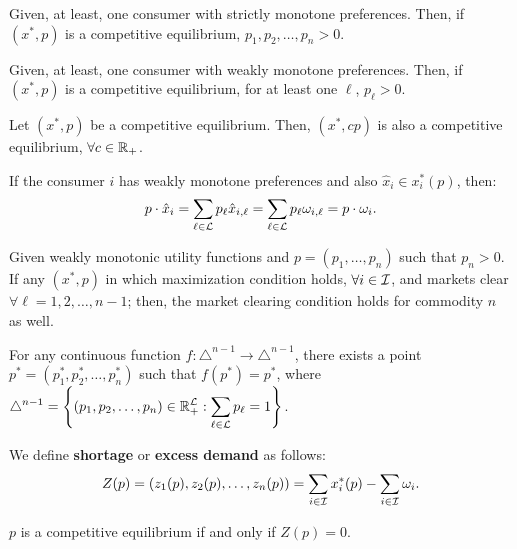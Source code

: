 \documentclass[8pt,a4paper]{extarticle}
\begin{document}
\begin{multicols}{3}
\begin{boxprop}
	Given, at least, one consumer with strictly monotone preferences. Then, if $(x^*, p)$ is a competitive equilibrium, $p_1, p_2, \ldots, p_n > 0$.
\end{boxprop}

\newpage

\begin{boxprop}
	Given, at least, one consumer with weakly monotone preferences. Then, if $(x^*, p)$ is a competitive equilibrium, for at least one $\ell$, $p_\ell > 0$.
\end{boxprop}

\begin{boxprop}
	Let $(x^*, p)$ be a competitive equilibrium. Then, $(x^*, cp)$ is also a competitive equilibrium, $\forall c \in \mathbb{R}_+$.
\end{boxprop}

\begin{boxtheo}
	If the consumer $i$ has weakly monotone preferences and also $\hat{x}_i \in x^*_i (p)$, then:
	\[
		p \cdot \hat{x}_i = \sum_{\ell \in \mathcal{L}} p_\ell \hat{x}_{i, \ell} = \sum_{\ell \in \mathcal{L}} p_\ell \omega_{i, \ell} = p \cdot \omega_i
	.\] 
\end{boxtheo}

\begin{boxcor}
	Given weakly monotonic utility functions and $p = (p_1, \ldots, p_n)$ such that $p_n > 0$. If any $(x^*, p)$ in which maximization condition holds, $\forall i \in \mathcal{I}$, and markets clear $\forall \ell = 1, 2, \ldots, n - 1$; then, the market clearing condition holds for commodity $n$ as well.
\end{boxcor}

\begin{boxtheo}
	For any continuous function $f : \triangle^{n - 1} \to \triangle^{n - 1}$, there exists a point $p^* = (p^*_1, p^*_2, \ldots, p^*_n)$ such that $f(p^*) = p^*$, where $\displaystyle \triangle^{n - 1} = \left\{(p_1, p_2, \ldots, p_n) \in \mathbb{R}_+^{\mathcal{L}} : \sum_{\ell \in \mathcal{L}} p_\ell = 1 \right\}$.
\end{boxtheo}

\begin{boxdef}[Shortage]
	We define \textbf{shortage} or \textbf{excess demand} as follows:
	\[
		Z(p) = (z_1(p), z_2(p), \ldots, z_n(p)) = \sum_{i \in \mathcal{I}} x^*_i(p) - \sum_{i \in \mathcal{I}} \omega_i
	.\] 
\end{boxdef}

\begin{boxprop}
	$p$ is a competitive equilibrium if and only if $Z(p) = 0$.
\end{boxprop}


\end{multicols}
\end{document}

